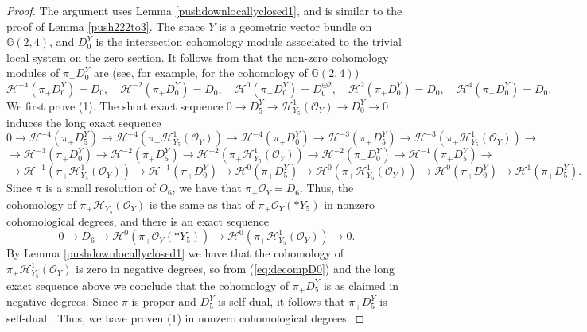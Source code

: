 \documentclass[11pt,reqno]{amsart}
\newcommand{\mc}[1]{\mathcal{#1}}
\newcommand{\ol}[1]{\overline{#1}}
\numberwithin{equation}{section}
\begin{document}
\begin{proof}
The argument uses Lemma \ref{pushdownlocallyclosed1}, and is similar to the proof of Lemma \ref{push222to3}. The space $Y$ is a geometric vector bundle on $\mathbb{G}(2,4)$, and $D_0^Y$ is the intersection cohomology module associated to the trivial local system on the zero section. It follows from \cite[Proposition 1.5.28]{htt} that the non-zero cohomology modules of $\pi_{+}D_0^Y$ are (see, for example, \cite[Theorem 3.10]{3264} for the cohomology of $\mathbb{G}(2,4)$)
\begin{equation}\label{eq:decompD0}
\mc{H}^{-4}(\pi_{+}D^Y_0)=D_0,\quad \mc{H}^{-2}(\pi_{+}D^Y_0)=D_0,\quad \mc{H}^{0}(\pi_{+}D^Y_0)=D_0^{\oplus 2},\quad \mc{H}^{2}(\pi_{+}D^Y_0)=D_0,\quad \mc{H}^{4}(\pi_{+}D^Y_0)=D_0.
\end{equation}
We first prove (1). The short exact sequence $0\to D^Y_5\to \mathscr{H}^1_{Y_5}(\mc{O}_Y) \to D^Y_0\to 0$ induces the long exact sequence
$$
0\to \mc{H}^{-4}(\pi_{+}D^Y_5)\to \mc{H}^{-4}(\pi_{+}\mathscr{H}^1_{Y_5}(\mc{O}_Y))\to \mc{H}^{-4}(\pi_{+}D^Y_0)\to \mc{H}^{-3}(\pi_{+}D^Y_5)\to \mc{H}^{-3}(\pi_{+}\mathscr{H}^1_{Y_5}(\mc{O}_Y))\to   
$$
$$
\to \mc{H}^{-3}(\pi_{+}D^Y_0)\to \mc{H}^{-2}(\pi_{+}D^Y_5)\to \mc{H}^{-2}(\pi_{+}\mathscr{H}^1_{Y_5}(\mc{O}_Y))\to \mc{H}^{-2}(\pi_{+}D^Y_0)\to \mc{H}^{-1}(\pi_{+}D^Y_5)\to 
$$
$$
\to \mc{H}^{-1}(\pi_{+}\mathscr{H}^1_{Y_5}(\mc{O}_Y))\to \mc{H}^{-1}(\pi_{+}D^Y_0)\to \mc{H}^{0}(\pi_{+}D^Y_5)\to \mc{H}^{0}(\pi_{+}\mathscr{H}^1_{Y_5}(\mc{O}_Y))\to \mc{H}^{0}(\pi_{+}D^Y_0) \to  \mc{H}^{1}(\pi_{+}D^Y_5).
$$
Since $\pi$ is a small resolution of $\ol{O}_6$, we have that $\pi_+\mc{O}_Y=D_6$. Thus, the cohomology of $\pi_{+}\mathscr{H}^1_{Y_5}(\mc{O}_Y)$ is the same as that of $\pi_{+}\mathcal{O}_Y(\ast Y_5)$ in nonzero cohomological degrees, and there is an exact sequence
\begin{equation}\label{eq:sesLocO5}
0\to D_6 \to \mc{H}^0(\pi_{+}\mathcal{O}_Y(\ast Y_5))\to \mc{H}^{0}(\pi_{+}\mathscr{H}^1_{Y_5}(\mc{O}_Y))\to 0.
\end{equation}
By Lemma \ref{pushdownlocallyclosed1} we have that the cohomology of $\pi_{+}\mathscr{H}^1_{Y_5}(\mc{O}_Y)$ is zero in negative degrees, so from (\ref{eq:decompD0}) and the long exact sequence above we conclude that the cohomology of $\pi_{+}D^Y_5$ is as claimed in negative degrees. Since $\pi$ is proper and $D_5^Y$ is self-dual, it follows that $\pi_{+}D_5^Y$ is self-dual \cite[Theorem 2.7.2]{htt}. Thus, we have proven (1) in nonzero cohomological degrees.


\end{proof}
\end{document}
